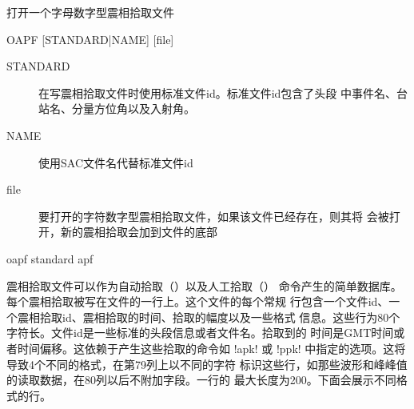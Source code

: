 \label{cmd:oapf}

打开一个字母数字型震相拾取文件

\begin{SACSTX}
OAPF [STANDARD|NAME] [file]
\end{SACSTX}

\begin{description}
\item [STANDARD] 在写震相拾取文件时使用标准文件id。标准文件id包含了头段
    中事件名、台站名、分量方位角以及入射角。
\item [NAME] 使用SAC文件名代替标准文件id
\item [file] 要打开的字符数字型震相拾取文件，如果该文件已经存在，则其将
    会被打开，新的震相拾取会加到文件的底部
\end{description}

\begin{SACDFT}
oapf standard apf
\end{SACDFT}

震相拾取文件可以作为自动拾取（）以及人工拾取（）
命令产生的简单数据库。每个震相拾取被写在文件的一行上。这个文件的每个常规
行包含一个文件id、一个震相拾取id、震相拾取的时间、拾取的幅度以及一些格式
信息。这些行为80个字符长。文件id是一些标准的头段信息或者文件名。拾取到的
时间是GMT时间或者时间偏移。这依赖于产生这些拾取的命令如 !apk! 或
!ppk! 中指定的选项。这将导致4个不同的格式，在第79列上以不同的字符
标识这些行，如那些波形和峰峰值的读取数据，在80列以后不附加字段。一行的
最大长度为200。下面会展示不同格式的行。
